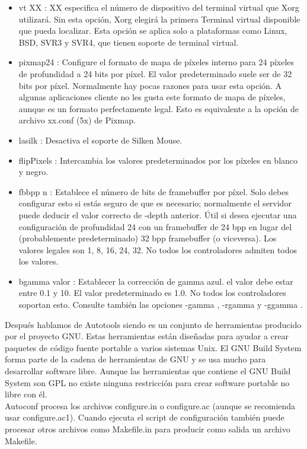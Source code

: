 \documentclass[11pt, a4paper]{report}
\begin{document}
\begin{itemize}
\item vt XX : XX especifica el número de dispositivo del terminal virtual que
  Xorg utilizará. Sin esta opción, Xorg elegirá la primera Terminal virtual
  disponible que pueda localizar. Esta opción se aplica solo a plataformas como
  Linux, BSD, SVR3 y SVR4, que tienen soporte de terminal virtual.
\item pixmap24 : Configure el formato de mapa de píxeles interno para 24
  píxeles de profundidad a 24 bits por píxel. El valor predeterminado suele ser
  de 32 bits por píxel. Normalmente hay pocas razones para usar esta opción. A
  algunas aplicaciones cliente no les gusta este formato de mapa de píxeles,
  aunque es un formato perfectamente legal. Esto es equivalente a la opción de
  archivo xx.conf (5x) de Pixmap.
\item lasilk : Desactiva el soporte de Silken Mouse.
\item flipPixels : Intercambia los valores predeterminados por los píxeles en
  blanco y negro.
\item fbbpp n : Establece el número de bits de framebuffer por píxel. Solo
  debes configurar esto si estás seguro de que es necesario; normalmente el
  servidor puede deducir el valor correcto de -depth anterior. Útil si desea
  ejecutar una configuración de profundidad 24 con un framebuffer de 24 bpp en
  lugar del (probablemente predeterminado) 32 bpp framebuffer (o viceversa).
  Los valores legales son 1, 8, 16, 24, 32. No todos los controladores admiten
  todos los valores.
\item bgamma valor : Establecer la corrección de gamma azul. el valor debe
  estar entre 0.1 y 10. El valor predeterminado es 1.0. No todos los
  controladores soportan esto. Consulte también las opciones -gamma , -rgamma
  y -ggamma .
\end{itemize}

Después hablamos de Autotools siendo es un conjunto de herramientas producido
por el proyecto GNU. Estas herramientas están diseñadas para ayudar a crear
paquetes de código fuente portable a varios sistemas Unix. El GNU Build System
forma parte de la cadena de herramientas de GNU y se usa mucho para desarrollar
software libre. Aunque las herramientas que contiene el GNU Build System son
GPL no existe ninguna restricción para crear software portable no libre con él. \\

Autoconf procesa los archivos
configure.in o configure.ac (aunque se recomienda
usar configure.ac1​). Cuando ejecuta el script de configuración también puede
procesar otros archivos como Makefile.in para producir como salida un archivo
Makefile. \\
\end{document}
